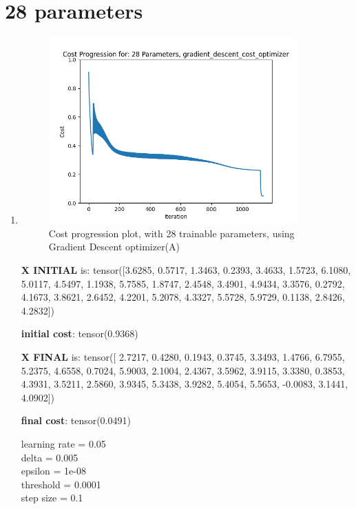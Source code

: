 \documentclass[inscr,ack,preface]{diphdthesis}
\begin{document}
\section{28 parameters}

\begin{enumerate}[label=\textbf{\Alph*.}]
    \item \textbf{  }
    
    \begin{figure}[H]
        \centering
        \includegraphics[width=0.9\textwidth]{28.png}
        \caption{Cost progression plot, with 28 trainable parameters, using Gradient Descent optimizer(A)} 
        \label{fig:fig1}
    \end{figure}
    
    \textbf{X INITIAL} is:
    tensor([3.6285, 0.5717, 1.3463, 0.2393, 3.4633, 1.5723, 6.1080, 5.0117, 4.5497,
            1.1938, 5.7585, 1.8747, 2.4548, 3.4901, 4.9434, 3.3576, 0.2792, 4.1673,
            3.8621, 2.6452, 4.2201, 5.2078, 4.3327, 5.5728, 5.9729, 0.1138, 2.8426,
            4.2832])
            
    \textbf{initial cost}: tensor(0.9368)
    
    \textbf{X FINAL} is:
    tensor([ 2.7217,  0.4280,  0.1943,  0.3745,  3.3493,  1.4766,  6.7955,  5.2375,
             4.6558,  0.7024,  5.9003,  2.1004,  2.4367,  3.5962,  3.9115,  3.3380,
             0.3853,  4.3931,  3.5211,  2.5860,  3.9345,  5.3438,  3.9282,  5.4054,
             5.5653, -0.0083,  3.1441,  4.0902])
    
    \textbf{final cost}: tensor(0.0491)
    
    learning rate =  0.05 \\
    delta =  0.005 \\
    epsilon =  1e-08 \\
    threshold =  0.0001\\ 
    step size =  0.1
    

\end{enumerate}
\end{document}

